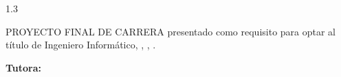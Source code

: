 \thispagestyle{empty}
\begin{spacing}{1.3}
\vspace*{1.2cm}
\begin{center}
{\large \Autor}
\end{center}

\vspace{1.6cm}

\begin{center}
{\Large\textbf{\TituloMay}}
\end{center}

\vspace{2.2cm}

PROYECTO FINAL DE CARRERA presentado como requisito para optar al título de Ingeniero Informático, \Universidad, \Campus, \Unidad.

\vspace{1.4cm}

\noindent\hfill
\begin{minipage}{0.65\textwidth}
  \raggedleft
  \textbf{Tutora:} \Tutora
\end{minipage}

\vfill

\begin{center}
\Ciudad\\[1.2ex]
\Anio
\end{center}
\end{spacing}
\clearpage
